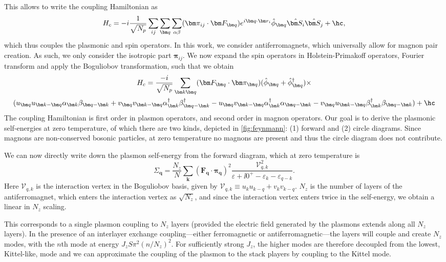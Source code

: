 This allows to write the coupling Hamiltonian as
\begin{equation}
	H_c = -i\frac{1}{\sqrt{N_p}}\sum_{ij}\sum_{\bm q}\sum_{\alpha\beta} (\bm\pi_{ij}\cdot \bm F_{\bm q}) e^{i\bm q\cdot\bm r_i} \hat\phi_{\bm q} \hat{\bm S_i} \hat{\bm S_j} + \hc,
\end{equation}
which thus couples the plasmonic and spin operators. In this work, we consider antiferromagnets, which universally allow for magnon pair creation. As such, we only consider the isotropic part $\bm\pi_{ij}$. We now expand the spin operators in Holstein-Primakoff operators, Fourier transform and apply the Boguliobov transformation, such that we obtain 
\begin{multline}
	H_c = \frac{-i}{\sqrt{N_p}}\sum_{\bm k \bm q} (\bm F_{\bm q}\cdot \bm \pi_{\bm q}) (\hat\phi_{\bm q} + \hat\phi_{\bm q}^\dagger) \times \\
	(u_{\bm q}u_{\bm k-\bm q}\alpha_{\bm k} \beta_{\bm q - \bm k} + v_{\bm q}v_{\bm k-\bm q} \alpha_{\bm k}^\dagger \beta_{\bm q - \bm k}^\dagger 
	-u_{\bm q}v_{\bm k-\bm q}\alpha_{\bm k}^\dagger \alpha_{\bm q - \bm k} - v_{\bm q}u_{\bm k-\bm q} \beta_ {\bm k}^\dagger \beta_{\bm q - \bm k}) + \hc 
\end{multline}
The coupling Hamiltonian is first order in plasmon operators, and second order in magnon operators. Our goal is to derive the plasmonic self-energies at zero temperature, of which there are two kinds, depicted in \cref{fig:feynmann}: (1) forward and (2) circle diagrams. Since magnons are non-conserved bosonic particles, at zero temperature no magnons are present and thus the circle diagram does not contribute. 

We can now directly write down the plasmon self-energy from the forward diagram, which at zero temperature is
\begin{equation}
	\Sigma_{\bm q} = \frac{N_z}{N}\sum_{\bm k}(\bm F_{\bm q}\cdot \bm \pi_{\bm q})^2 \frac{\mathcal V_{q,k}^2}{\varepsilon + \ii 0^+ -\varepsilon_k - \varepsilon_{q-k}}. \label{eq:self-energy}
\end{equation}
Here $ \mathcal V_{q,k}$ is the interaction vertex in the Boguliobov basis, given by $ \mathcal V_{q,k}\equiv u_k u_{k-q} +v_k v_{k-q}$. $N_z$ is the number of layers of the antiferromagnet, which enters the interaction vertex as $\sqrt{N_z}$, and since the interaction vertex enters twice in the self-energy, we obtain a linear in $N_z$ scaling.

This corresponds to a single plasmon coupling to $N_z$ layers (provided the electric field generated by the plasmons extends along all $N_z$ layers). In the presence of an interlayer exchange coupling---either ferromagnetic or antiferromagnetic---the layers will couple and create $N_z$ modes, with the $n$th mode at energy $J_z S \pi^2 (n/N_z)^2$. For sufficiently strong $J_z$, the higher modes are therefore decoupled from the lowest, Kittel-like, mode and we can approximate the coupling of the plasmon to the stack players by coupling to the Kittel mode. 


